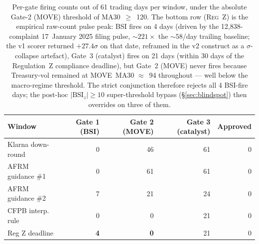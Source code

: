\documentclass[11pt,letterpaper]{article}
\newcommand{\bsi}{\text{BSI}}
\begin{document}
\begin{table}[H]
\centering
\small
\begin{tabular}{lrrrr}
\toprule
\textbf{Window} & \textbf{Gate 1 (BSI)} & \textbf{Gate 2 (MOVE)} &
\textbf{Gate 3 (catalyst)} & \textbf{Approved}\\
\midrule
Klarna down-round &  0 & 46 & 61 & 0\\
AFRM guidance \#1 &  0 & 61 & 61 & 0\\
AFRM guidance \#2 &  7 & 21 & 24 & 0\\
CFPB interp. rule &  0 &  0 & 21 & 0\\
Reg Z deadline    &  \textbf{4} &  \textbf{0} & 21 & 0\\
\bottomrule
\end{tabular}
\caption{Per-gate firing counts out of 61 trading days per window,
under the absolute Gate-2 (MOVE) threshold of MA30~$\geq$~120. The
bottom row (\textsc{Reg~Z}) is the empirical raw-count pulse peak:
BSI fires on 4 days (driven by the 12{,}838-complaint 17~January 2025
filing pulse, $\sim\!221\times$ the $\sim\!58$/day trailing baseline;
the v1 scorer returned $+27.4\sigma$ on that date, reframed in the v2
construct as a $\sigma$-collapse artefact), Gate~3 (catalyst) fires
on 21 days (within 30 days of the Regulation~Z compliance deadline),
but Gate~2 (MOVE) never fires because Treasury-vol remained at
MOVE~MA30 $\approx$~94 throughout --- well below the macro-regime
threshold. The strict conjunction therefore rejects all 4 BSI-fire
days; the post-hoc $|\bsi_z|\geq10$ super-threshold bypass
(\S\ref{sec:blindspot}) then overrides on three of them.}
\label{tab:gatedecomp}
\end{table}
\end{document}
